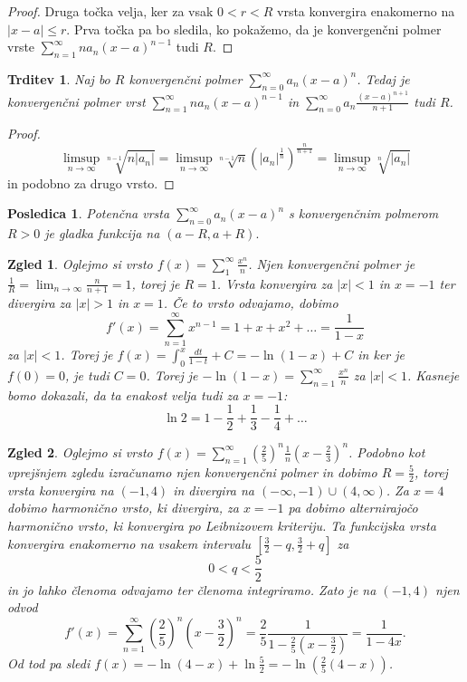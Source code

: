 \documentclass[10pt, a4paper]{article}
\newtheorem{posledica}[izr]{Posledica}
\newtheorem{trditev}[izr]{Trditev}
\newtheorem{zgled}{Zgled}[section]
\newenvironment{noticeC}{%
  \tcolorbox[%
  notitle,
  empty,
  enhanced,  %
  breakable,
  coltext=black, 
  fontupper=\rmfamily,
  parbox=false,
  noparskip,
  sharp corners,
  boxrule=-1pt,  %
  frame hidden,
  left=7pt,  %
  right=7pt,
  top=5pt,
  bottom=5pt,
  before skip=2.5ex plus 2pt,
  after skip=2.5ex plus 2pt,
  overlay unbroken and last={%
  },
  ]}
{\endtcolorbox}
\newenvironment{dokaz}%
  {\begin{noticeC}\begin{proof}}%
  {\end{proof}\end{noticeC}}
\newcommand{\limzap}[1]{\lim_{n \to \infty} {#1}}
\begin{document}
\begin{dokaz}
    Druga točka velja, ker za vsak $0 < r < R$ vrsta konvergira enakomerno na $|x-a| \leq r.$
    Prva točka pa bo sledila, ko pokažemo, da je konvergenčni polmer vrste $\sum_{n=1} ^\infty n a_n (x-a)^{n-1}$ tudi $R$.
\end{dokaz}

\begin{trditev}
    Naj bo $R$ konvergenčni polmer $\sum_{n=0} ^\infty a_n (x-a)^n$.
    Tedaj je konvergenčni polmer vrst $\sum_{n=1} ^\infty n a_n (x-a)^{n-1}$ in 
    $\sum_{n=0} ^\infty a_n \frac{(x-a)^{n+1}}{n+1}$ tudi $R$.
\end{trditev}

\begin{dokaz}
    $$\limsup_{n \to \infty} \sqrt[n-1] {n |a_n|} = \limsup_{n \to \infty} \sqrt[n-1] {n} \left(|a_n|^{\frac{1}{n}}\right) ^{\frac{n}{n+1}} = \limsup_{n \to \infty} \sqrt[n]{|a_n|}$$
    in podobno za drugo vrsto.
\end{dokaz}

\begin{posledica}
    Potenčna vrsta $\sum_{n=0} ^\infty a_n (x-a)^n$ s konvergenčnim polmerom $R > 0$ je gladka funkcija na $(a - R, a+ R).$
\end{posledica}

\begin{zgled}
    Oglejmo si vrsto $f(x) = \sum_{1} ^\infty \frac{x^n}{n}$.
    Njen konvergenčni polmer je $\frac{1}{R} = \limzap{\frac{n}{n+1}} = 1$, torej je $R = 1$.
    Vrsta konvergira za $|x| < 1$ in $x = -1$ ter divergira za $|x| > 1$ in $x = 1$.
    Če to vrsto odvajamo, dobimo $$f'(x) = \sum_{n=1} ^\infty x^{n-1} = 1+ x+ x^2 + \dots = \frac{1}{1 - x}$$ za $|x| < 1$.
    Torej je $f(x) = \int_0 ^x \frac{dt}{1-t} + C = -\ln(1-x) + C$ in ker je $f(0) = 0$, je tudi $C = 0$.
    Torej je $- \ln(1-x) = \sum_{n=1} ^\infty \frac{x^n}{n}$ za $|x| < 1$.
    Kasneje bomo dokazali, da ta enakost velja tudi za $x = -1$:
    $$\ln 2 = 1 - \frac{1}{2} + \frac{1}{3} - \frac{1}{4} + \dots$$
\end{zgled}

\begin{zgled}
    Oglejmo si vrsto $f(x) = \sum_{n = 1} ^\infty \left(\frac{2}{5}\right)^n \frac{1}{n} \left(x - \frac{2}{3} \right)^n$.
    Podobno kot vprejšnjem zgledu izračunamo njen konvergenčni polmer in dobimo $R = \frac{5}{2}$,
    torej vrsta konvergira na $(-1, 4)$ in divergira na $(-\infty, -1) \cup (4, \infty)$.
    Za $x = 4$ dobimo harmonično vrsto, ki divergira, za $x = -1$ pa dobimo alternirajočo harmonično vrsto, ki konvergira po Leibnizovem kriteriju.
    Ta funkcijska vrsta konvergira enakomerno na vsakem intervalu $[\frac{3}{2} - q, \frac{3}{2} + q]$ za $$0 < q < \frac{5}{2}$$
    in jo lahko členoma odvajamo ter členoma integriramo.
    Zato je na $(-1, 4)$ njen odvod $$f'(x) = \sum_{n=1} ^\infty \left(\frac{2}{5}\right)^n \left(x - \frac{3}{2}\right)^n = \frac{2}{5} \frac{1}{1 - \frac{2}{5} (x - \frac{3}{2})} = \frac{1}{1-4x}.$$
    Od tod pa sledi $f(x) = -\ln(4-x) + \ln \frac{5}{2} = - \ln(\frac{2}{5} (4-x))$.
\end{zgled}
\end{document}
